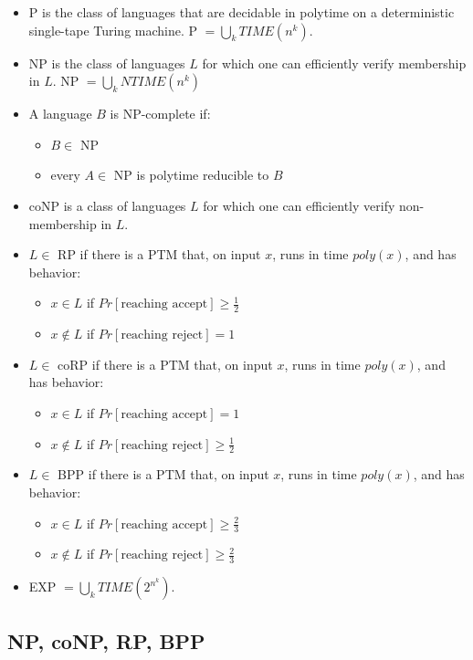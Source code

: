 \documentclass[10pt,landscape,a4paper]{article}
\begin{document}
\begin{multicols*}{3}
\begin{itemize}
    \item P is the class of languages that are decidable in polytime on a deterministic single-tape Turing machine. P $= \bigcup\limits_{k} TIME(n^k)$.
    \item NP is the class of languages $L$ for which one can efficiently verify membership in $L$. NP $= \bigcup\limits_{k} NTIME(n^k)$
    \item A language $B$ is NP-complete if:
    \begin{itemize}
        \item $B \in$ NP
        \item every $A \in$ NP is polytime reducible to $B$
    \end{itemize}
    \item coNP is a class of languages $L$ for which one can efficiently verify non-membership in $L$.
    \item $L \in$ RP if there is a PTM that, on input $x$, runs in time $poly(x)$, and has behavior:
    \begin{itemize}
        \item $x \in L$ if $Pr[\text{reaching accept}] \geq \frac{1}{2}$
        \item $x \notin L$ if $Pr[\text{reaching reject}] = 1$
    \end{itemize}
    \item $L \in$ coRP if there is a PTM that, on input $x$, runs in time $poly(x)$, and has behavior:
    \begin{itemize}
        \item $x \in L$ if $Pr[\text{reaching accept}] = 1$
        \item $x \notin L$ if $Pr[\text{reaching reject}] \geq \frac{1}{2}$
    \end{itemize}
    \item $L \in$ BPP if there is a PTM that, on input $x$, runs in time $poly(x)$, and has behavior:
    \begin{itemize}
        \item $x \in L$ if $Pr[\text{reaching accept}] \geq \frac{2}{3}$
        \item $x \notin L$ if $Pr[\text{reaching reject}] \geq \frac{2}{3}$
    \end{itemize}
    \item EXP $= \bigcup\limits_{k} TIME(2^{n^k})$.
\end{itemize}

\subsection{NP, coNP, RP, BPP}


\end{multicols*}
\end{document}
